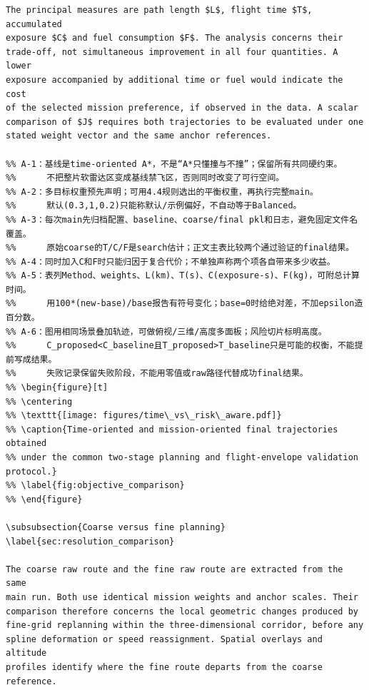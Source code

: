 \documentclass[12pt]{article}
\begin{document}
\begin{verbatim}
The principal measures are path length $L$, flight time $T$, accumulated
exposure $C$ and fuel consumption $F$. The analysis concerns their
trade-off, not simultaneous improvement in all four quantities. A lower
exposure accompanied by additional time or fuel would indicate the cost
of the selected mission preference, if observed in the data. A scalar
comparison of $J$ requires both trajectories to be evaluated under one
stated weight vector and the same anchor references.

%% A-1：基线是time-oriented A*，不是“A*只懂撞与不撞”；保留所有共同硬约束。
%%      不把整片软雷达区变成基线禁飞区，否则同时改变了可行空间。
%% A-2：多目标权重预先声明；可用4.4规则选出的平衡权重，再执行完整main。
%%      默认(0.3,1,0.2)只能称默认/示例偏好，不自动等于Balanced。
%% A-3：每次main先归档配置、baseline、coarse/final pkl和日志，避免固定文件名覆盖。
%%      原始coarse的T/C/F是search估计；正文主表比较两个通过验证的final结果。
%% A-4：同时加入C和F时只能归因于复合代价；不单独声称两个项各自带来多少收益。
%% A-5：表列Method、weights、L(km)、T(s)、C(exposure-s)、F(kg)，可附总计算时间。
%%      用100*(new-base)/base报告有符号变化；base=0时给绝对差，不加epsilon造百分数。
%% A-6：图用相同场景叠加轨迹，可做俯视/三维/高度多面板；风险切片标明高度。
%%      C_proposed<C_baseline且T_proposed>T_baseline只是可能的权衡，不能提前写成结果。
%%      失败记录保留失败阶段，不能用零值或raw路径代替成功final结果。
%% \begin{figure}[t]
%% \centering
%% \texttt{[image: figures/time\_vs\_risk\_aware.pdf]}
%% \caption{Time-oriented and mission-oriented final trajectories obtained
%% under the common two-stage planning and flight-envelope validation protocol.}
%% \label{fig:objective_comparison}
%% \end{figure}

\subsubsection{Coarse versus fine planning}
\label{sec:resolution_comparison}

The coarse raw route and the fine raw route are extracted from the same
main run. Both use identical mission weights and anchor scales. Their
comparison therefore concerns the local geometric changes produced by
fine-grid replanning within the three-dimensional corridor, before any
spline deformation or speed reassignment. Spatial overlays and altitude
profiles identify where the fine route departs from the coarse reference.


\end{verbatim}
\end{document}
